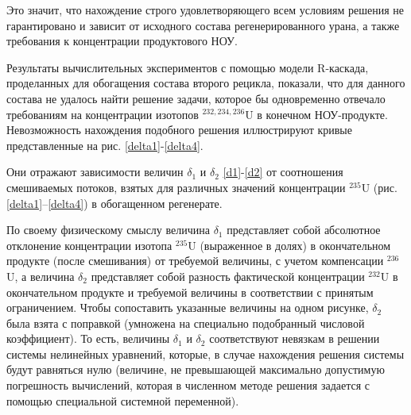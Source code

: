 Это значит, что нахождение строго удовлетворяющего всем условиям решения не гарантировано и зависит от исходного состава регенерированного урана, а также требования к концентрации продуктового НОУ.

Результаты вычислительных экспериментов с помощью модели R-каскада, проделанных для обогащения состава второго рецикла, показали, что для данного состава не удалось найти решение задачи, которое бы одновременно отвечало требованиям на концентрации изотопов $^{232,234,236}$U в конечном НОУ-продукте. Невозможность нахождения подобного решения иллюстрируют кривые представленные на рис. \ref{delta1}-\ref{delta4}.

Они отражают зависимости величин $\delta_1$ и $\delta_2$ \ref{d1}-\ref{d2} от соотношения смешиваемых потоков, взятых для различных значений концентрации $^{235}$U (рис. \ref{delta1}--\ref{delta4}) в обогащенном регенерате.



По своему физическому смыслу величина $\delta_1$ представляет собой абсолютное отклонение концентрации изотопа $^{235}$U (выраженное в долях) в окончательном продукте (после смешивания) от требуемой величины, с учетом компенсации $^{236}$U, а величина $\delta_2$ представляет собой разность фактической концентрации $^{232}$U в окончательном продукте и требуемой величины в соответствии с принятым ограничением. Чтобы сопоставить указанные величины на одном рисунке, $\delta_2$ была взята с поправкой (умножена на специально подобранный числовой коэффициент). То есть, величины $\delta_1$ и $\delta_2$ соответствуют невязкам в решении системы нелинейных уравнений, которые, в случае нахождения решения системы будут равняться нулю (величине, не превышающей максимально допустимую погрешность вычислений, которая в численном методе решения задается с помощью специальной системной переменной).

